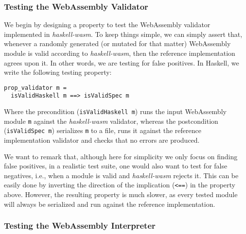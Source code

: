 \documentclass[acmsmall, anonymous]{acmart}
\begin{document}
\subsubsection{Testing the WebAssembly Validator}

We begin by designing a property to test the WebAssembly validator implemented
in \textit{haskell-wasm}.
%
To keep things simple, we can simply assert that, whenever a randomly generated
(or mutated for that matter) WebAssembly module is valid according to
\textit{haskell-wasm}, then the reference implementation agrees upon it.
%
In other words, we are testing for false positives.
%
In Haskell, we write the following testing property:

\begin{verbatim}
prop_validator m =
  isValidHaskell m ==> isValidSpec m
\end{verbatim}

Where the precondition (\texttt{isValidHaskell m}) runs the input WebAssembly
module \texttt{m} against the \textit{haskell-wasm} validator, whereas the
postcondition (\texttt{isValidSpec m}) serializes \texttt{m} to a file, runs it
against the reference implementation validator and checks that no errors are
produced.

We want to remark that, although here for simplicity we only focus on finding
false positives, in a realistic test suite, one would also want to test for
false negatives, i.e., when a module is valid and \textit{haskell-wasm} rejects
it.
%
This can be easily done by inverting the direction of the implication
(\texttt{<==}) in the property above.
%
However, the resulting property is much slower, as every tested module will
always be serialized and run against the reference implementation.




\subsubsection{Testing the WebAssembly Interpreter}
\end{document}
